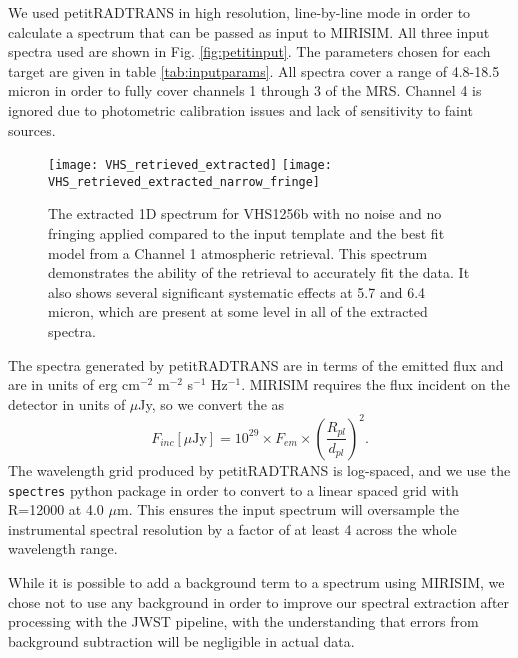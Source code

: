 We used petitRADTRANS in high resolution, line-by-line mode in order to calculate a spectrum that can be passed as input to MIRISIM.
All three input spectra used are shown in Fig. \ref{fig:petitinput}.
The parameters chosen for each target are given in table \ref{tab:inputparams}. 
All spectra cover a range of 4.8-18.5 micron in order to fully cover channels 1 through 3 of the MRS. 
Channel 4 is ignored due to photometric calibration issues and lack of sensitivity to faint sources.

\begin{figure}[t]
	\texttt{[image: VHS\_retrieved\_extracted]}
	\texttt{[image: VHS\_retrieved\_extracted\_narrow\_fringe]}
	\caption{The extracted 1D spectrum for VHS1256b with no noise and no fringing applied compared to the input template and the best fit model from a Channel 1 atmospheric retrieval. This spectrum demonstrates the ability of the retrieval to accurately fit the data. It also shows several significant systematic effects at 5.7 and 6.4 micron, which are present at some level in all of the extracted spectra.}
	\label{fig:vhsnofringeextractedbestfit}
\end{figure}
The spectra generated by petitRADTRANS are in terms of the emitted flux and are in units of erg cm$^{-2}$ m$^{-2}$ s$^{-1}$ Hz$^{-1}$. 
MIRISIM requires the flux incident on the detector in units of $\mu$Jy, so we convert the as 
\begin{equation}
F_{inc} [\mu\textrm{Jy}] = 10^{29}\times F_{em} \times \left(\frac{R_{pl}}{d_{pl}}\right)^{2}.
\end{equation}
The wavelength grid produced by petitRADTRANS is log-spaced, and we use the \verb|spectres| python package \parencite{Carnall2017} in order to convert to a linear spaced grid with R=12000 at 4.0 $\mu$m. 
This ensures the input spectrum will oversample the instrumental spectral resolution by a factor of at least 4 across the whole wavelength range.

While it is possible to add a background term to a spectrum using MIRISIM, we chose not to use any background in order to improve our spectral extraction after processing with the JWST pipeline, with the understanding that errors from background subtraction will be negligible in actual data.

